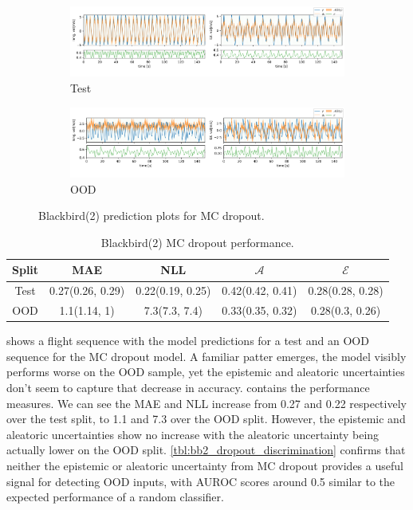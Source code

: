 \begin{figure}[h]
  \centering
  
  \begin{subfigure}[b]{\textwidth}
    \includegraphics[width=\textwidth]{Experiments/figs/bb2_dropout_test.png}
    \caption{Test}
  \end{subfigure}
  
  \begin{subfigure}[b]{\textwidth}
    \includegraphics[width=\textwidth]{Experiments/figs/bb2_dropout_ood.png}
    \caption{OOD}
  \end{subfigure}
  
  \caption{Blackbird(2) prediction plots for MC dropout.}
  \label{fig:bb2_dropout_run}
\end{figure}

\begin{table}[h]
\centering
    \begin{tabular}{c  c  c  c  c }  
        \toprule
        Split & MAE & NLL & $\mathcal{A}$ & $\mathcal{E}$\\
        \midrule
        Test & 0.27(0.26, 0.29) & 0.22(0.19, 0.25) & 0.42(0.42, 0.41) &  0.28(0.28, 0.28)\\
        OOD  &  1.1(1.14, 1) &  7.3(7.3, 7.4) & 0.33(0.35, 0.32)&  0.28(0.3, 0.26)\\
        \midrule
    \end{tabular}
    \caption{Blackbird(2) MC dropout performance.}
    \label{tbl:bb2_dropout}
\end{table}



 shows a flight sequence with the model predictions for a test and an OOD sequence for the MC dropout model. A familiar patter emerges, the model visibly performs worse on the OOD sample, yet the epistemic and aleatoric uncertainties don't seem to capture that decrease in accuracy.  contains the performance measures. We can see the MAE and NLL increase from 0.27 and 0.22 respectively over the test split, to 1.1 and 7.3 over the OOD split. However, the epistemic and aleatoric uncertainties show no increase with the aleatoric uncertainty being actually lower on the OOD split. \cref{tbl:bb2_dropout_discrimination} confirms that neither the epistemic or aleatoric uncertainty from MC dropout provides a useful signal for detecting OOD inputs, with AUROC scores around 0.5 similar to the expected performance of a random classifier. 


